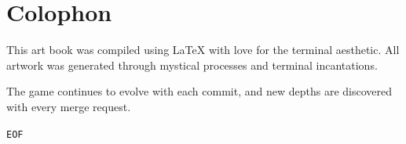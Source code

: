 \documentclass[11pt,a4paper]{book}
\begin{document}
\chapter*{Colophon}

This art book was compiled using \LaTeX{} with love for the terminal aesthetic. All artwork was generated through mystical processes and terminal incantations. 

The game continues to evolve with each commit, and new depths are discovered with every merge request.

\vspace{1cm}

\begin{center}
\texttt{EOF}
\end{center}
\end{document}
